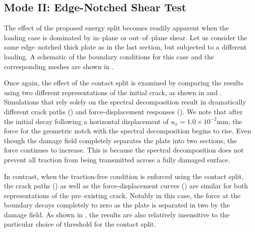 \subsection{Mode II: Edge-Notched Shear Test}

The effect of the proposed energy split becomes readily apparent when the loading case is dominated by in--plane or out--of--plane shear. Let us consider the same edge--notched thick plate as in the last section, but subjected to a different loading. A schematic of the boundary conditions for this case and the corresponding meshes are shown in .





Once again, the effect of the contact split is examined by comparing the results using two different representations of the initial crack, as shown in  and .
Simulations that rely solely on the spectral decomposition result in dramatically different crack paths ()
and force-displacement responses (). We note that after the initial decay following a horizontal displacement of $u_x = 1.0\times 10^{-2}$mm, the force for the geometric notch with the spectral decomposition begins to rise.  Even though the damage field completely separates the plate into two sections, the force continues to increase.  This is because the spectral decomposition does not prevent all traction from being transmitted across a fully damaged surface.

In contrast, when the traction-free condition is enforced using the contact split, the crack paths () as well as the force-displacement curves () are similar for both representations of the pre--existing crack.
Notably in this case, the force at the boundary decays completely to zero as the plate is separated in two by the damage field.   As shown in , the results are also relatively insensitive to the particular choice of threshold for the contact split.

